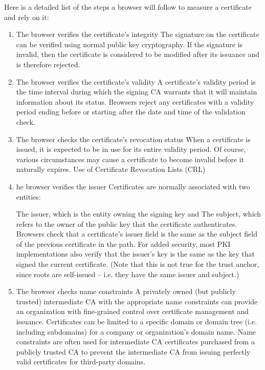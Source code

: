 \documentclass[letterpaper,12pt]{article}
\begin{document}
Here is a detailed list of the steps a browser will follow to measure a certificate and rely on it\cite{SSL_CERT}:
\begin{enumerate}
    \item  The browser verifies the certificate’s integrity
The signature on the certificate can be verified using normal public key cryptography. If the signature is invalid, then the certificate is considered to be modified after its issuance and is therefore rejected.
\item The browser verifies the certificate’s validity
A certificate’s validity period is the time interval during which the signing CA warrants that it will maintain information about its status. Browsers reject any certificates with a validity period ending before or starting after the date and time of the validation check.
\item The browser checks the certificate’s revocation status
When a certificate is issued, it is expected to be in use for its entire validity period. Of course, various circumstances may cause a certificate to become invalid before it naturally expires. Use of Certificate Revocation Lists (CRL)

\item he browser verifies the issuer
Certificates are normally associated with two entities:

The issuer, which is the entity owning the signing key and
The subject, which refers to the owner of the public key that the certificate authenticates.
Browsers check that a certificate’s issuer field is the same as the subject field of the previous certificate in the path. For added security, most PKI implementations also verify that the issuer’s key is the same as the key that signed the current certificate. (Note that this is not true for the trust anchor, since roots are self-issued – i.e. they have the same issuer and subject.)

\item The browser checks name constraints
A privately owned (but publicly trusted) intermediate CA with the appropriate name constraints can provide an organization with fine-grained control over certificate management and issuance. Certificates can be limited to a specific domain or domain tree (i.e. including subdomains) for a company or organization’s domain name. Name constraints are often used for intermediate CA certificates purchased from a publicly trusted CA to prevent the intermediate CA from issuing perfectly valid certificates for third-party domains.


\end{enumerate}
\end{document}
